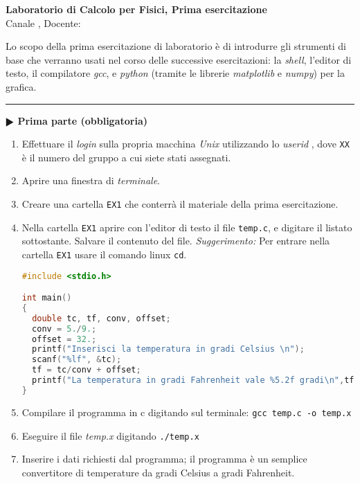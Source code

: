 \documentclass[11pt]{article}
\begin{document}
\pagestyle{empty}

\begin{center}
{\Large \bf  Laboratorio di Calcolo per Fisici, Prima esercitazione\\[2mm]}
{\large Canale \canale, Docente: \docente}
\end{center}
\vspace{4mm}

\begin{mdframed}[backgroundcolor=panna]
  Lo scopo della prima esercitazione di laboratorio \`e di introdurre gli strumenti di base che verranno usati nel corso delle successive esercitazioni:
  la {\em shell}, l'editor di testo, il compilatore {\em gcc}, e {\em python\/} (tramite le librerie
  {\em matplotlib\/} e {\em numpy\/}) per la grafica.
\\
\end{mdframed}
%
%

\hrule
\vspace{2mm}
\textbf{$\RHD$ Prima parte (obbligatoria)} 
\begin{enumerate}
\item Effettuare il {\em login\/} sulla propria macchina {\em Unix\/} utilizzando lo {\em userid\/} \texttt{\login}, 
dove \texttt{XX} \`e il numero del gruppo a cui siete stati assegnati.
\item Aprire una finestra di {\em terminale}.
\item Creare una cartella  \texttt{EX1} che conterrà il materiale della prima esercitazione.
\item Nella cartella \texttt{EX1} aprire con l'editor di testo il file \texttt{temp.c}, e digitare il listato sottostante. Salvare il contenuto del file. {\em Suggerimento:} Per entrare nella cartella \texttt{EX1} usare il comando linux \texttt{cd}.
\begin{lstlisting}[caption={Programma \texttt{temp.c}},language=c]
#include <stdio.h>

int main()
{
  double tc, tf, conv, offset;
  conv = 5./9.;
  offset = 32.;
  printf("Inserisci la temperatura in gradi Celsius \n");
  scanf("%lf", &tc);
  tf = tc/conv + offset;
  printf("La temperatura in gradi Fahrenheit vale %5.2f gradi\n",tf);
}
\end{lstlisting}
\item Compilare il programma in c digitando sul terminale:
  \texttt{gcc temp.c -o temp.x}
\item Eseguire il file {\em temp.x\/} digitando \texttt{./temp.x}
\item Inserire i dati richiesti dal programma; il programma \`e un semplice convertitore di temperature da gradi Celsius a gradi Fahrenheit.
\end{enumerate}
\end{document}

